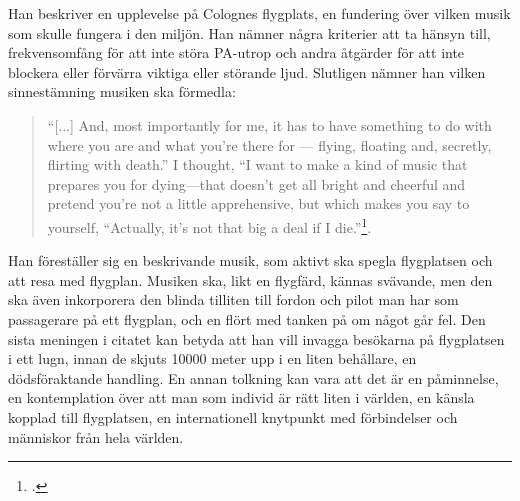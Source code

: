 \documentclass{article}
\begin{document}
Han beskriver en upplevelse på Colognes flygplats, en fundering över vilken musik som skulle fungera i den
miljön. Han nämner några kriterier att ta hänsyn till, frekvensomfång för att inte störa PA-utrop och andra
åtgärder för att inte blockera eller förvärra viktiga eller störande ljud. Slutligen nämner han vilken
sinnestämning musiken ska förmedla:

\begin{quote}
``[...] And, most importantly for me, it has to have
something to do with where you are and what you’re there for — flying, floating and, secretly, flirting with
death.'' I thought, ``I want to make a kind of music that prepares you for dying—that doesn’t get all bright and
cheerful and pretend you’re not a little apprehensive, but which makes you say to yourself, ``Actually, it’s
not that big a deal if I die.''\footcite[152]{Eno}.
\end{quote}

Han föreställer sig en beskrivande musik, som aktivt ska spegla flygplatsen och att resa med flygplan. Musiken
ska, likt en flygfärd, kännas svävande, men den ska även inkorporera den blinda tilliten till fordon och pilot
man har som passagerare på ett flygplan, och en flört med tanken på om något går fel. Den sista meningen i
citatet kan betyda att han vill invagga besökarna på flygplatsen i ett lugn, innan de skjuts 10000 meter upp 
i en liten behållare, en dödsföraktande handling. En annan tolkning kan vara att det är en påminnelse, en
kontemplation över att man som individ är rätt liten i världen, en känsla kopplad till flygplatsen, en
internationell knytpunkt med förbindelser och människor från hela världen. 




\end{document}
